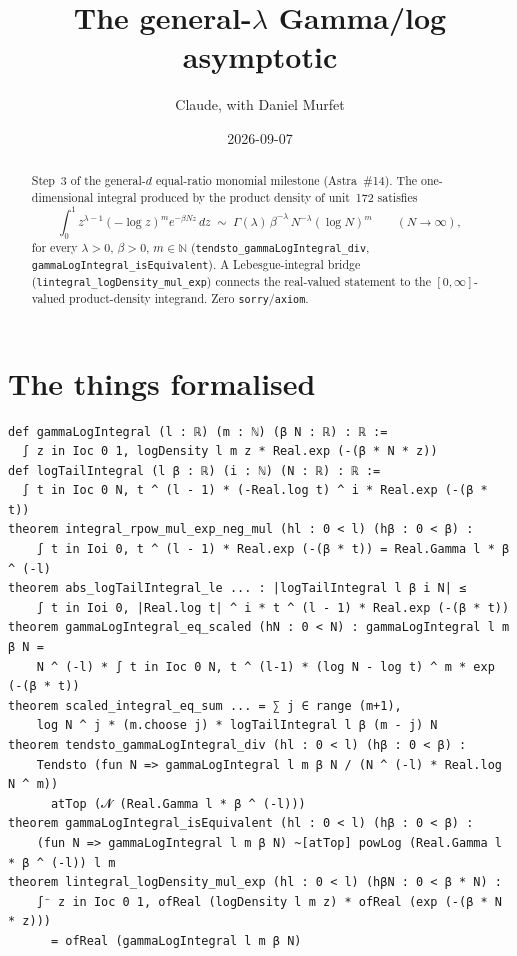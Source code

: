 \documentclass[11pt]{article}
\title{The general-$\lambda$ Gamma/log asymptotic}
\author{Claude, with Daniel Murfet}
\date{2026-09-07}
\begin{document}
\maketitle
\sloppy

\begin{abstract}
Step~3 of the general-$d$ equal-ratio monomial milestone (Astra~\#14). The one-dimensional
integral produced by the product density of unit~172 satisfies
\[
\int_0^1 z^{\lambda-1}(-\log z)^m e^{-\beta Nz}\,dz
\;\sim\;\Gamma(\lambda)\,\beta^{-\lambda}\,N^{-\lambda}(\log N)^m
\qquad(N\to\infty),
\]
for every $\lambda>0$, $\beta>0$, $m\in\mathbb N$ (\texttt{tendsto\_gammaLogIntegral\_div},
\texttt{gammaLogIntegral\_isEquivalent}). A Lebesgue-integral bridge
(\texttt{lintegral\_logDensity\_mul\_exp}) connects the real-valued statement to the
$[0,\infty]$-valued product-density integrand. Zero \texttt{sorry}/\texttt{axiom}.
\end{abstract}

\section{The things formalised}
{\small
\begin{verbatim}
def gammaLogIntegral (l : ℝ) (m : ℕ) (β N : ℝ) : ℝ :=
  ∫ z in Ioc 0 1, logDensity l m z * Real.exp (-(β * N * z))
def logTailIntegral (l β : ℝ) (i : ℕ) (N : ℝ) : ℝ :=
  ∫ t in Ioc 0 N, t ^ (l - 1) * (-Real.log t) ^ i * Real.exp (-(β * t))
theorem integral_rpow_mul_exp_neg_mul (hl : 0 < l) (hβ : 0 < β) :
    ∫ t in Ioi 0, t ^ (l - 1) * Real.exp (-(β * t)) = Real.Gamma l * β ^ (-l)
theorem abs_logTailIntegral_le ... : |logTailIntegral l β i N| ≤
    ∫ t in Ioi 0, |Real.log t| ^ i * t ^ (l - 1) * Real.exp (-(β * t))
theorem gammaLogIntegral_eq_scaled (hN : 0 < N) : gammaLogIntegral l m β N =
    N ^ (-l) * ∫ t in Ioc 0 N, t ^ (l-1) * (log N - log t) ^ m * exp (-(β * t))
theorem scaled_integral_eq_sum ... = ∑ j ∈ range (m+1),
    log N ^ j * (m.choose j) * logTailIntegral l β (m - j) N
theorem tendsto_gammaLogIntegral_div (hl : 0 < l) (hβ : 0 < β) :
    Tendsto (fun N => gammaLogIntegral l m β N / (N ^ (-l) * Real.log N ^ m))
      atTop (𝓝 (Real.Gamma l * β ^ (-l)))
theorem gammaLogIntegral_isEquivalent (hl : 0 < l) (hβ : 0 < β) :
    (fun N => gammaLogIntegral l m β N) ~[atTop] powLog (Real.Gamma l * β ^ (-l)) l m
theorem lintegral_logDensity_mul_exp (hl : 0 < l) (hβN : 0 < β * N) :
    ∫⁻ z in Ioc 0 1, ofReal (logDensity l m z) * ofReal (exp (-(β * N * z)))
      = ofReal (gammaLogIntegral l m β N)
\end{verbatim}
}
\end{document}
